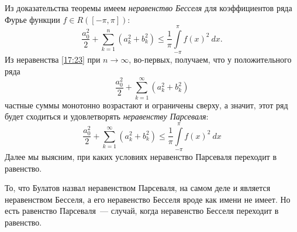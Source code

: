 \documentclass[../../main.tex]{subfiles}
\begin{document}
	Из доказательства теоремы имеем \emph{неравенство Бесселя} для коэффициентов 
	ряда Фурье функции $f \in R\left( [-\pi,\pi]\right) $:
	\begin{equation}
	\label{17:23}
	\frac{a_0^2}{2} + \sum_{k=1}^{n} \left( a_k^2 + b_k^2\right) \le 
	\frac{1}{\pi}  \int\limits_{-\pi}^{\pi} f(x)^2 \ dx.
	\end{equation}
	Из неравенства \eqref{17:23} при $n \to \infty$, во-первых, получаем, что у 
	положительного ряда
	\[  \frac{a_0^2}{2} + \sum_{k=1}^{\infty} \left( a_k^2 + b_k^2  \right)     \]
	частные суммы монотонно возрастают и ограничены сверху, а значит, этот ряд 
	будет сходиться и удовлетворять \emph{неравенству Парсеваля}: 
	\begin{equation}
	\label{17:24}
	\frac{a_0^2}{2} + \sum_{k=1}^{\infty} \left( a_k^2 + b_k^2\right) \le 
	\frac{1}{\pi}  \int\limits_{-\pi}^{\pi} f(x)^2 \ dx
	\end{equation}
	Далее мы выясним, при каких условиях неравенство Парсеваля переходит в 
	равенство.
	
	\begin{erem}
	То, что Булатов назвал неравенством Парсеваля, на самом деле и является 
	неравенством Бесселя, а его неравенство Бесселя вроде как имени не имеет. Но 
	есть равенство Парсеваля~--- случай, когда неравенство Бесселя переходит в 
	равенство.
	\end{erem}
	
\end{document}
